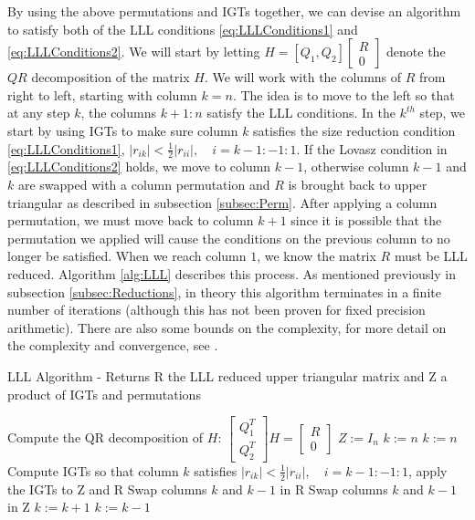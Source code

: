 \documentclass[12pt,Bold,letterpaper]{mcgilletdclass}
\newcommand{\bmx}{\begin{bmatrix}}
\newcommand{\emx}{\end{bmatrix}}
\newcommand{\bsmx}{\left[\begin{smallmatrix}}
\newcommand{\esmx}{\end{smallmatrix}\right]}
\begin{document}
By using the above permutations and IGTs together, we can devise an algorithm to
satisfy both of the LLL conditions \eqref{eq:LLLConditions1} and
\eqref{eq:LLLConditions2}. We will start by letting $H=[Q_1, Q_2] \bmx R \\ 0
\emx$ denote the $QR$ decomposition of the matrix $H$. We will work with the
columns of $R$ from right to left, starting with column $k=n$. The idea is to
move to the left so that at any step $k$, the columns $k+1:n$ satisfy the LLL
conditions. In the $k^{th}$ step, we start by using IGTs to make sure column $k$
satisfies the size reduction condition \eqref{eq:LLLConditions1}, $|r_{ik}| <
\frac{1}{2}|r_{ii}|, \quad i = k-1:-1:1$. If the Lovasz condition in
\eqref{eq:LLLConditions2} holds, we move to column $k-1$, otherwise column $k-1$
and $k$ are swapped with a column permutation and $R$ is brought back to upper
triangular as described in subsection \ref{subsec:Perm}. After applying a column
permutation, we must move back to column $k+1$ since it is possible that the
permutation we applied will cause the conditions on the previous column to no
longer be satisfied. When we reach column $1$, we know the matrix $R$ must be
LLL reduced. Algorithm \ref{alg:LLL} describes this process. As mentioned
previously in subsection \ref{subsec:Reductions}, in theory this algorithm terminates in a
finite number of iterations (although this has not been proven for fixed precision arithmetic). There are also some bounds on the complexity, for more
detail on the complexity and convergence, see \cite{WubSJM11}.

\begin{algorithm}
\caption{LLL Algorithm - Returns R the LLL reduced upper triangular matrix and Z a product of IGTs and permutations}
\label{alg:LLL}
\begin{algorithmic}[1]
\STATE Compute the QR decomposition of $H$: $\bsmx Q_1^T \\ Q_2^T \esmx H= \bsmx R\\ 0 \esmx$
\STATE $Z := I_n$
\STATE $k := n$
		\STATE $k := n$	
	\ENDIF
	\STATE Compute IGTs so that column $k$ satisfies $|r_{ik}| < \frac{1}{2}|r_{ii}|, \quad i = k-1:-1:1$, apply the IGTs 		to Z and R
		\STATE Swap columns $k$ and $k-1$ in R
		\STATE Swap columns $k$ and $k-1$ in Z
		\STATE $k := k+1$
	\ELSE
		\STATE $k := k-1$
	\ENDIF
\ENDWHILE
\end{algorithmic}
\end{algorithm}
\end{document}
